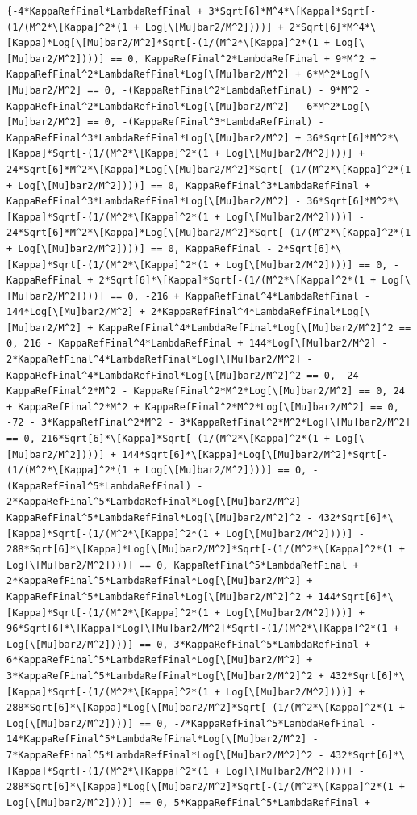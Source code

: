 \documentclass[11pt]{article}
\begin{document}
\begin{verbatim}
{-4*KappaRefFinal*LambdaRefFinal + 3*Sqrt[6]*M^4*\[Kappa]*Sqrt[-(1/(M^2*\[Kappa]^2*(1 + Log[\[Mu]bar2/M^2])))] + 2*Sqrt[6]*M^4*\[Kappa]*Log[\[Mu]bar2/M^2]*Sqrt[-(1/(M^2*\[Kappa]^2*(1 + Log[\[Mu]bar2/M^2])))] == 0, KappaRefFinal^2*LambdaRefFinal + 9*M^2 + KappaRefFinal^2*LambdaRefFinal*Log[\[Mu]bar2/M^2] + 6*M^2*Log[\[Mu]bar2/M^2] == 0, -(KappaRefFinal^2*LambdaRefFinal) - 9*M^2 - KappaRefFinal^2*LambdaRefFinal*Log[\[Mu]bar2/M^2] - 6*M^2*Log[\[Mu]bar2/M^2] == 0, -(KappaRefFinal^3*LambdaRefFinal) - KappaRefFinal^3*LambdaRefFinal*Log[\[Mu]bar2/M^2] + 36*Sqrt[6]*M^2*\[Kappa]*Sqrt[-(1/(M^2*\[Kappa]^2*(1 + Log[\[Mu]bar2/M^2])))] + 24*Sqrt[6]*M^2*\[Kappa]*Log[\[Mu]bar2/M^2]*Sqrt[-(1/(M^2*\[Kappa]^2*(1 + Log[\[Mu]bar2/M^2])))] == 0, KappaRefFinal^3*LambdaRefFinal + KappaRefFinal^3*LambdaRefFinal*Log[\[Mu]bar2/M^2] - 36*Sqrt[6]*M^2*\[Kappa]*Sqrt[-(1/(M^2*\[Kappa]^2*(1 + Log[\[Mu]bar2/M^2])))] - 24*Sqrt[6]*M^2*\[Kappa]*Log[\[Mu]bar2/M^2]*Sqrt[-(1/(M^2*\[Kappa]^2*(1 + Log[\[Mu]bar2/M^2])))] == 0, KappaRefFinal - 2*Sqrt[6]*\[Kappa]*Sqrt[-(1/(M^2*\[Kappa]^2*(1 + Log[\[Mu]bar2/M^2])))] == 0, -KappaRefFinal + 2*Sqrt[6]*\[Kappa]*Sqrt[-(1/(M^2*\[Kappa]^2*(1 + Log[\[Mu]bar2/M^2])))] == 0, -216 + KappaRefFinal^4*LambdaRefFinal - 144*Log[\[Mu]bar2/M^2] + 2*KappaRefFinal^4*LambdaRefFinal*Log[\[Mu]bar2/M^2] + KappaRefFinal^4*LambdaRefFinal*Log[\[Mu]bar2/M^2]^2 == 0, 216 - KappaRefFinal^4*LambdaRefFinal + 144*Log[\[Mu]bar2/M^2] - 2*KappaRefFinal^4*LambdaRefFinal*Log[\[Mu]bar2/M^2] - KappaRefFinal^4*LambdaRefFinal*Log[\[Mu]bar2/M^2]^2 == 0, -24 - KappaRefFinal^2*M^2 - KappaRefFinal^2*M^2*Log[\[Mu]bar2/M^2] == 0, 24 + KappaRefFinal^2*M^2 + KappaRefFinal^2*M^2*Log[\[Mu]bar2/M^2] == 0, -72 - 3*KappaRefFinal^2*M^2 - 3*KappaRefFinal^2*M^2*Log[\[Mu]bar2/M^2] == 0, 216*Sqrt[6]*\[Kappa]*Sqrt[-(1/(M^2*\[Kappa]^2*(1 + Log[\[Mu]bar2/M^2])))] + 144*Sqrt[6]*\[Kappa]*Log[\[Mu]bar2/M^2]*Sqrt[-(1/(M^2*\[Kappa]^2*(1 + Log[\[Mu]bar2/M^2])))] == 0, -(KappaRefFinal^5*LambdaRefFinal) - 2*KappaRefFinal^5*LambdaRefFinal*Log[\[Mu]bar2/M^2] - KappaRefFinal^5*LambdaRefFinal*Log[\[Mu]bar2/M^2]^2 - 432*Sqrt[6]*\[Kappa]*Sqrt[-(1/(M^2*\[Kappa]^2*(1 + Log[\[Mu]bar2/M^2])))] - 288*Sqrt[6]*\[Kappa]*Log[\[Mu]bar2/M^2]*Sqrt[-(1/(M^2*\[Kappa]^2*(1 + Log[\[Mu]bar2/M^2])))] == 0, KappaRefFinal^5*LambdaRefFinal + 2*KappaRefFinal^5*LambdaRefFinal*Log[\[Mu]bar2/M^2] + KappaRefFinal^5*LambdaRefFinal*Log[\[Mu]bar2/M^2]^2 + 144*Sqrt[6]*\[Kappa]*Sqrt[-(1/(M^2*\[Kappa]^2*(1 + Log[\[Mu]bar2/M^2])))] + 96*Sqrt[6]*\[Kappa]*Log[\[Mu]bar2/M^2]*Sqrt[-(1/(M^2*\[Kappa]^2*(1 + Log[\[Mu]bar2/M^2])))] == 0, 3*KappaRefFinal^5*LambdaRefFinal + 6*KappaRefFinal^5*LambdaRefFinal*Log[\[Mu]bar2/M^2] + 3*KappaRefFinal^5*LambdaRefFinal*Log[\[Mu]bar2/M^2]^2 + 432*Sqrt[6]*\[Kappa]*Sqrt[-(1/(M^2*\[Kappa]^2*(1 + Log[\[Mu]bar2/M^2])))] + 288*Sqrt[6]*\[Kappa]*Log[\[Mu]bar2/M^2]*Sqrt[-(1/(M^2*\[Kappa]^2*(1 + Log[\[Mu]bar2/M^2])))] == 0, -7*KappaRefFinal^5*LambdaRefFinal - 14*KappaRefFinal^5*LambdaRefFinal*Log[\[Mu]bar2/M^2] - 7*KappaRefFinal^5*LambdaRefFinal*Log[\[Mu]bar2/M^2]^2 - 432*Sqrt[6]*\[Kappa]*Sqrt[-(1/(M^2*\[Kappa]^2*(1 + Log[\[Mu]bar2/M^2])))] - 288*Sqrt[6]*\[Kappa]*Log[\[Mu]bar2/M^2]*Sqrt[-(1/(M^2*\[Kappa]^2*(1 + Log[\[Mu]bar2/M^2])))] == 0, 5*KappaRefFinal^5*LambdaRefFinal + 
\end{verbatim}
\end{document}
